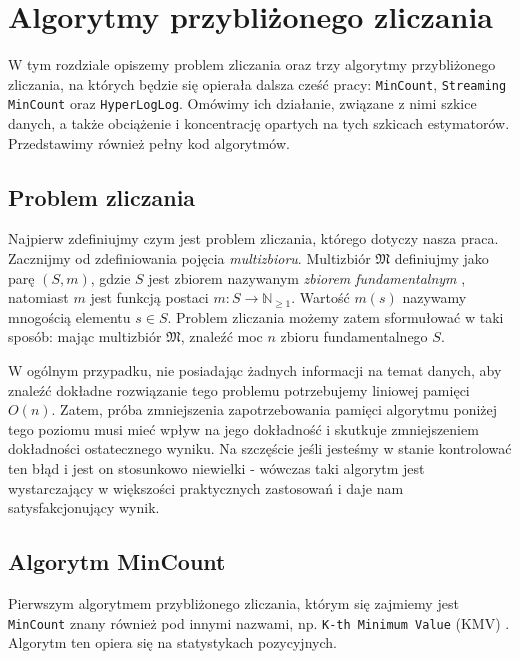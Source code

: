 \chapter{Algorytmy przybliżonego zliczania}
\thispagestyle{chapterBeginStyle}
\label{rozdzial1}

W tym rozdziale  opiszemy problem zliczania oraz trzy  algorytmy przybliżonego zliczania, na których będzie się opierała dalsza cześć pracy:  \texttt{MinCount},  \texttt{Streaming MinCount} oraz \texttt{HyperLogLog}. Omówimy ich działanie, związane z nimi szkice danych, a także obciążenie i koncentrację opartych na tych szkicach estymatorów. Przedstawimy również pełny kod algorytmów. 


\section{Problem zliczania}
Najpierw zdefiniujmy czym jest problem zliczania, którego dotyczy nasza praca.
Zacznijmy od zdefiniowania pojęcia \textit{multizbioru}. Multizbiór $\mathfrak{M}$ definiujmy jako parę $(S, m)$, gdzie $S$ jest zbiorem nazywanym \textit{zbiorem fundamentalnym} , natomiast $m$ jest funkcją postaci $m : S \rightarrow \mathbb{N}_{\geq 1}$. Wartość $m(s)$ nazywamy mnogością elementu $s \in S$. Problem zliczania możemy zatem sformułować w taki sposób: mając multizbiór $\mathfrak{M}$, znaleźć moc $n$ zbioru fundamentalnego $S$.

W ogólnym przypadku, nie posiadając żadnych informacji na temat danych, aby znaleźć dokładne rozwiązanie tego problemu potrzebujemy liniowej pamięci $O(n)$. Zatem, próba zmniejszenia zapotrzebowania pamięci algorytmu poniżej tego poziomu musi mieć wpływ na jego dokładność i skutkuje zmniejszeniem dokładności ostatecznego wyniku. Na szczęście jeśli jesteśmy w stanie kontrolować ten błąd i jest on stosunkowo niewielki - wówczas taki algorytm jest wystarczający w większości praktycznych zastosowań i daje nam satysfakcjonujący wynik.


\section{Algorytm MinCount}
\label{mincount}

Pierwszym algorytmem przybliżonego zliczania, którym się zajmiemy jest \texttt{MinCount} znany również pod innymi nazwami, np.  \texttt{K-th Minimum Value} (KMV) \cite{kmv}. Algorytm ten opiera się na statystykach pozycyjnych.

